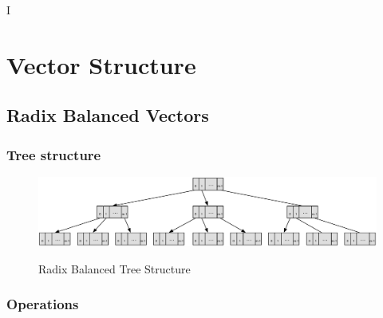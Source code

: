 I%

\chapter{Vector Structure} %

\label{VectorStructure} %



\section{Radix Balanced Vectors}


\subsection{Tree structure}

\begin{figure}[h!]
  \centering
  \includegraphics[width=\textwidth]{Figures/Radix_Balanced}
  \label{badix_balanced}
  \caption{Radix Balanced Tree Structure}
\end{figure}



\subsection{Operations}

